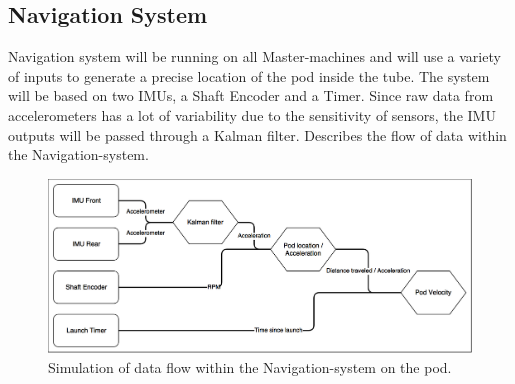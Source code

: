         
\subsection{Navigation System}
Navigation system will be running on all Master-machines and will use a variety of inputs to generate a precise location of the pod inside the tube. The system will be based on two IMUs, a Shaft Encoder and a Timer. Since raw data from accelerometers has a lot of variability due to the sensitivity of sensors, the IMU outputs will be passed through a Kalman filter.  Describes the flow of data within the Navigation-system.

\begin{figure}
    \centering
    \includegraphics[width=\textwidth]{images/navigation_system.png}
    \caption{Simulation of data flow within the Navigation-system on the pod.}
    \label{fig:navigation-system}
\end{figure}


